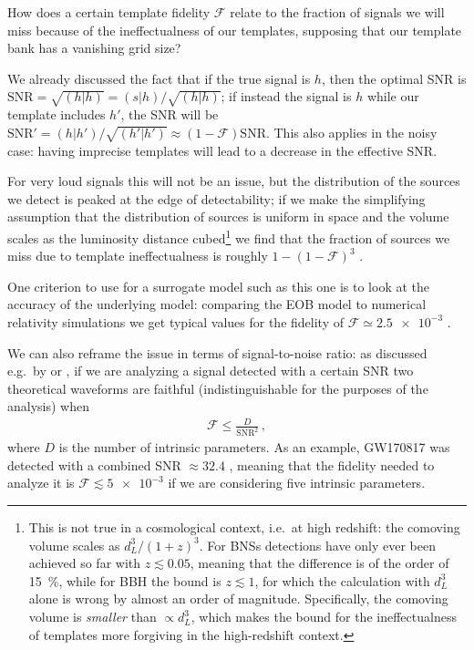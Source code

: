 \documentclass[main.tex]{subfiles}
\begin{document}
How does a certain template fidelity \(\mathcal{F}\) relate to the fraction of signals we will miss because of the ineffectualness of our templates, supposing that our template bank has a vanishing grid size? 

We already discussed the fact that if the true signal is \(h\), then the optimal \ac{SNR} is \(\text{SNR} = \sqrt{(h|h)} = (s|h) / \sqrt{(h|h)}\); if instead the signal is \(h\) while our template includes \(h'\), the \ac{SNR} will be \(\text{SNR}' = (h|h') / \sqrt{(h'|h')} \approx (1 - \mathcal{F}) \text{SNR}\). 
This also applies in the noisy case: having imprecise templates will lead to a decrease in the effective \ac{SNR}. 

For very loud signals this will not be an issue, but the distribution of the sources we detect is peaked at the edge of detectability; if we make the simplifying assumption that the distribution of sources is uniform in space and the volume scales as the luminosity distance cubed\footnote{This is not true in a cosmological context, i.e.\ at high redshift: the comoving volume scales as \(d_L^3 / (1+z)^3\). For \acp{BNS} detections have only ever been achieved so far with \(z \lesssim 0.05\), meaning that the difference is of the order of \SI{15}{\%}, while for \ac{BBH} the bound is \(z\lesssim 1\), for which the calculation with \(d_L^3\) alone is wrong by almost an order of magnitude. Specifically, the comoving volume is \emph{smaller} than \(\propto d_L^3\), which makes the bound for the ineffectualness of templates more forgiving in the high-redshift context.} we find that the fraction of sources we miss due to template ineffectualness is roughly \(1 - (1-\mathcal{F})^3\) \cites[eq.\ 18]{damourAccuracyEffectualnessClosedform2011}[eq.\ 2.21]{owenSearchTemplatesGravitational1996}.

One criterion to use for a surrogate model such as this one is to look at the accuracy of the underlying model: comparing the \ac{EOB} model to numerical relativity simulations we get typical values for the fidelity of \(\mathcal{F} \simeq \num{2.5e-3}\) \cite[]{nagarTimedomainEffectiveonebodyGravitational2018}.

We can also reframe the issue in terms of signal-to-noise ratio: as discussed e.g.\ by \textcite[]{lindblomModelWaveformAccuracy2008} or \textcite[]{gambaFastFaithfulFrequencydomain2020}, if we are analyzing a signal detected with a certain \ac{SNR} two theoretical waveforms are faithful (indistinguishable for the purposes of the analysis) when 
%
\begin{align}
\mathcal{F} \leq \frac{D}{\text{SNR}^2}
\,,
\end{align}
%
where \(D\) is the number of intrinsic parameters. 
As an example, GW170817 was detected with a combined SNR \(\approx 32.4\) \cite[]{abbottGW170817ObservationGravitational2017}, meaning that the fidelity needed to analyze it is \(\mathcal{F} \lesssim \num{5e-3}\) if we are considering five intrinsic parameters.
\end{document}
